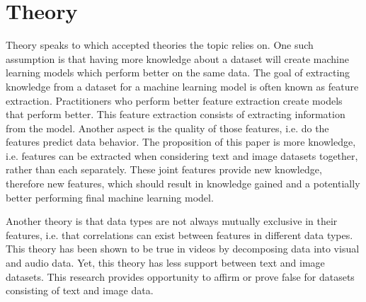 \chapter{Theory} %

Theory speaks to which accepted theories the topic relies on.  One such assumption is that having more knowledge about a dataset will create machine learning models which perform better on the same data.  The goal of extracting knowledge from a dataset for a machine learning model is often known as feature extraction.  Practitioners who perform better feature extraction create models that perform better.  This feature extraction consists of extracting information from the model.  Another aspect is the quality of those features, i.e. do the features predict data behavior.  The proposition of this paper is more knowledge, i.e. features can be extracted when considering text and image datasets together, rather than each separately.  These joint features provide new knowledge, therefore new features, which should result in knowledge gained and a potentially better performing final machine learning model.  

Another theory is that data types are not always mutually exclusive in their features, i.e. that correlations can exist between features in different data types.  This theory has been shown to be true in videos by decomposing data into visual and audio data.  Yet, this theory has less support between text and image datasets.  This research provides opportunity to affirm or prove false for datasets consisting of text and image data.  


